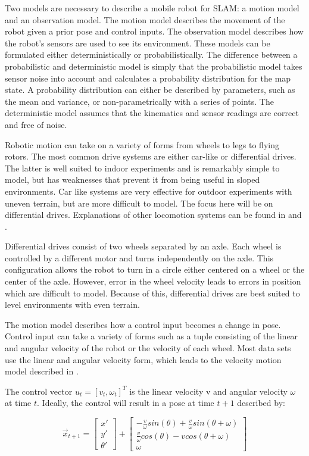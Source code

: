 \documentclass[12pt]{article}
\begin{document}
Two models are necessary to describe a mobile robot for SLAM:  a motion model and an observation model.  The motion model describes the movement of the robot given a prior pose and control inputs.  The observation model describes how the robot’s sensors are used to see its environment.  These models can be formulated either deterministically or probabilistically.  The difference between a probabilistic and deterministic model is simply that the probabilistic model takes sensor noise into account and calculates a probability distribution for the map state.  A probability distribution can either be described by parameters, such as the mean and variance, or non-parametrically with a series of points.  The deterministic model assumes that the kinematics and sensor readings are correct and free of noise.  

Robotic motion can take on a variety of forms from wheels to legs to flying rotors.  The most common drive systems are either car-like or differential drives.  The latter is well suited to indoor experiments and is remarkably simple to model, but has weaknesses that prevent it from being useful in sloped environments.  Car like systems are very effective for outdoor experiments with uneven terrain, but are more difficult to model.  The focus here will be on differential drives.  Explanations of other locomotion systems can be found in \cite{Dudek} and \cite{DBLP}.

Differential drives consist of two wheels separated by an axle.  Each wheel is controlled by a different motor and turns independently on the axle.  This configuration allows the robot to turn in a circle either centered on a wheel or the center of the axle.  However, error in the wheel velocity leads to errors in position which are difficult to model.  Because of this, differential drives are best suited to level environments with even terrain.  

The motion model describes how a control input becomes a change in pose.  Control input can take a variety of forms such as a tuple consisting of the linear and angular velocity of the robot or the velocity of each wheel.  Most data sets \cite{Radish} use the linear and angular velocity form, which leads to the velocity motion model described in \cite{ThrunPR2005}.

The control vector $u_{t} =[v_{t}, \omega_{t}]^T$ is the linear velocity v and angular velocity $\omega$ at time $t$.  Ideally, the control will result in a pose at time $t+1$ described by:

\begin{equation}\label{motion_model}
\vec{x}_{t+1}=
\left[ {\begin{array}{cc}
 x' \\
 y' \\
\theta'
\end{array} } \right] +
\left[ {\begin{array}{cc}
 -\frac{v}{\omega} sin(\theta)+\frac{v}{\omega} sin(\theta + \omega) \\
 \frac{v}{\omega} cos(\theta)-v cos(\theta + \omega)  \\
\omega
\end{array} } \right] 
\end{equation}
\end{document}
